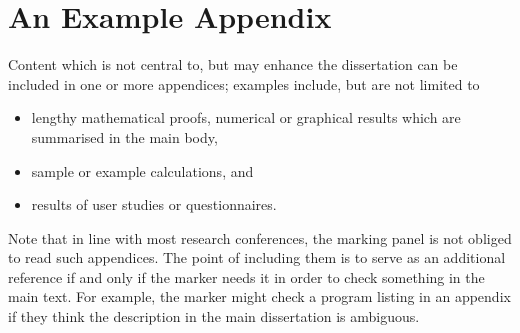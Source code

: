 \documentclass[oneside,%
                    author={Malak Hajji},
                    degree={BSc},
                    title={Designing An Accessible Computational Toolkit For Students},
                  subtitle={With Mixed Visual Abilities}]{dissertation}
\begin{document}
\backmatter





\appendix

\chapter{An Example Appendix}
\label{appx:example}

Content which is not central to, but may enhance the dissertation can be 
included in one or more appendices; examples include, but are not limited
to

\begin{itemize}
\item lengthy mathematical proofs, numerical or graphical results which 
      are summarised in the main body,
\item sample or example calculations, 
      and
\item results of user studies or questionnaires.
\end{itemize}

\noindent
Note that in line with most research conferences, the marking panel is not
obliged to read such appendices. The point of including them is to serve as
an additional reference if and only if the marker needs it in order to check
something in the main text. For example, the marker might check a program listing 
in an appendix if they think the description in the main dissertation is ambiguous.

\end{document}
